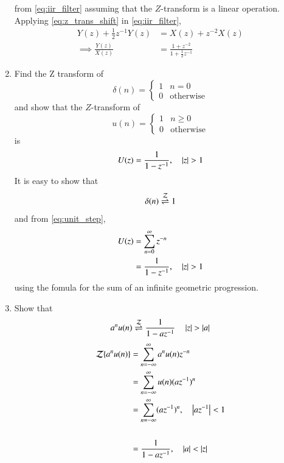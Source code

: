 \begin{enumerate}[label=\thesection.\arabic*]
\begin{equation}
\end{equation}
%
from  \eqref{eq:iir_filter} assuming that the $Z$-transform is a linear operation.
\\
\solution  Applying \eqref{eq:z_trans_shift} in \eqref{eq:iir_filter},
\begin{align}
Y(z) + \frac{1}{2}z^{-1}Y(z) &= X(z)+z^{-2}X(z)
\\
\implies \frac{Y(z)}{X(z)} &= \frac{1 + z^{-2}}{1 + \frac{1}{2}z^{-1}}
\label{eq:freq_resp}
\end{align}
%
\item Find the Z transform of 
\begin{equation}
\delta(n)
=
\begin{cases}
1 & n = 0
\\
0 & \text{otherwise}
\end{cases}
\end{equation}
and show that the $Z$-transform of
\begin{equation}
\label{eq:unit_step}
u(n)
=
\begin{cases}
1 & n \ge 0
\\
0 & \text{otherwise}
\end{cases}
\end{equation}
is
\begin{equation}
U(z) = \frac{1}{1-z^{-1}}, \quad \left\vert z\right\vert > 1
\end{equation}
\solution It is easy to show that
\begin{equation}
\delta(n) \overset{\mathcal{Z}}{ \rightleftharpoons} 1
\end{equation}
and from \eqref{eq:unit_step},
\begin{align}
U(z) &= \sum _{n= 0}^{\infty}z^{-n}
\\
&=\frac{1}{1-z^{-1}}, \quad \left\vert z\right\vert > 1
\end{align}
using the fomula for the sum of an infinite geometric progression.
%
\item Show that 
\begin{equation}
\label{eq:anun}
a^nu(n) \overset{\mathcal{Z}}{ \rightleftharpoons} \frac{1}{1-az^{-1}} \quad \left\vert z\right\vert > \left\vert a\right\vert
\end{equation}
\solution
\begin{align}
{\mathcal {Z}}\{a^nu(n)\} &=\sum _{n=-\infty }^{\infty }a^nu(n)z^{-n}
\\
&=\sum _{n=-\infty }^{\infty }u(n) (az^{-1})^{n}
\\
&=\sum _{n=-\infty }^{\infty }(az^{-1})^{n} , \quad \abs{az^{-1}} < 1\\
\\
&= \frac{1}{1-az^{-1}} , \quad \abs{a} < \abs{z}

\end{align}
\end{enumerate}
